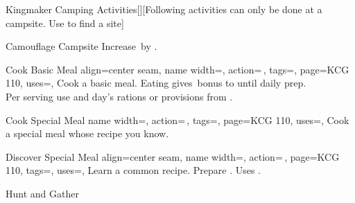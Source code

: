 \begin{PageFront}
\begin{Tables}{\frontTableHeight}
\begin{Table}{Kingmaker Camping Activities}[][Following activities can only be done at a campsite. Use
         to find a site]
\begin{entry}{Camouflage Campsite}
                Increase  \DC\,by .\hfill{}\\
                \phant{}
            \end{entry}
            \begin{entry}{Cook Basic Meal}{%
                align=center seam,
                name width=\activityLength,%
                action=\,,
                tags=\Manipulate,
                page=KCG 110,
                uses={},
            }
                Cook a basic meal. Eating gives \,\Status bonus to  until daily prep.\\
                Per serving use   and  day's rations or provisions from .\\
                 \hfill {}
            \end{entry}
            \begin{entry}{Cook Special Meal}{%
                name width=\activityLength,%
                action=\,,
                tags=\Manipulate,
                page=KCG 110,
                uses={},
            }
                Cook a special meal whose recipe you know. \hfill{}
            \end{entry}
            \begin{entry}{Discover Special Meal}{%
                align=center seam,
                name width=\activityLength,%
                action=\,,
                page=KCG 110,
                tags=\Manipulate,
                uses=,
            }
                Learn a common recipe. Prepare  . Uses . \hfill
                \\
                \hfill{} \quad {}
            \end{entry}
            \begin{entry}{Hunt and Gather}{%
}
\end{entry}
\end{Table}
\end{Tables}
\end{PageFront}
